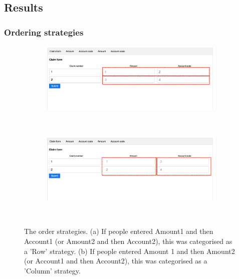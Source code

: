 \begin{table}
\begin{itemize}

\subsection{Results}

\subsubsection{Ordering strategies}
\begin{figure}[!ht]
    \centering
    \begin{subfigure}[b]{0.5\textwidth}
        \includegraphics[width=\textwidth]{images/Study4/ch34_4-roworderstr.png}
        \caption{}
        \label{fig:ch34_4-roworderstr}
    \end{subfigure}
    ~ %
    \begin{subfigure}[b]{0.5\textwidth}
        \includegraphics[width=\textwidth]{images/Study4/ch34_4-columnorderstr.png}
        \caption{}
        \label{fig:columnorderstr}
    \end{subfigure}
    ~ %
    \caption{The order strategies. (a)  If people entered Amount1 and then Account1 (or Amount2 and then Account2), this was categorised as a 'Row' strategy. (b) If people entered Amount 1 and then Amount2 (or Account1 and then Account2), this was categorised as a 'Column' strategy.}\label{fig:ch34_4-orderstr}
\end{figure}



\end{itemize}
\end{table}
